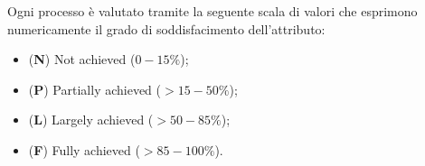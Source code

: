 Ogni processo è valutato tramite la seguente scala di valori che esprimono numericamente il grado di soddisfacimento dell’attributo:
\begin{itemize}
  \item (\textbf{N}) Not achieved (\(0-15\%\));
  \item (\textbf{P}) Partially achieved (\(>15-50\%\));
  \item (\textbf{L}) Largely achieved (\(>50-85\%\));
  \item (\textbf{F}) Fully achieved (\(>85-100\%\)). 
\end{itemize}

%
%
%
%
%
